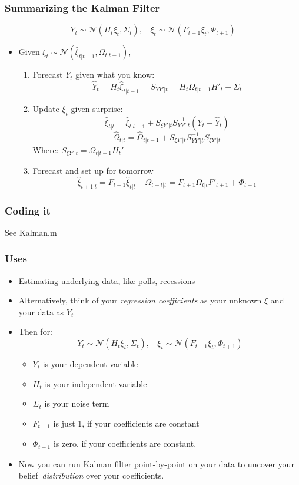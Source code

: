 \documentclass{beamer}
\begin{document}
\begin{frame}
\frametitle[alignment=center]{Summarizing the Kalman Filter}
$$Y_t\sim\mathcal{N}\left(H_t\xi_t,\Sigma_t\right),\ \ \ \ \xi_{t}\sim\mathcal{N}\left(F_{t+1}\xi_t,\Phi_{t+1}\right)$$
\begin{itemize}
\item Given $\xi_t\sim\mathcal{N}(\hat{\xi}_{t|t-1},\Omega_{t|t-1})$,
\begin{enumerate}
\item Forecast $Y_t$ given what you know:
$$\hat{Y}_t=H_t\hat{\xi}_{t|t-1}\ \ \ \ \ \ S_{YY'|t}=H_t\Omega_{t|t-1}H'_t+\Sigma_t$$
\item Update $\xi_t$ given surprise:
$$\hat{\xi}_{t|t}=\hat{\xi}_{t|t-1}+S_{\xi Y'|t}S_{YY'|t}^{-1}(Y_t-\hat{Y}_t)$$
$$\hat{\Omega}_{t|t}=\hat{\Omega}_{t|t-1}+S_{\xi Y'|t}S_{YY'|t}^{-1}S_{\xi Y'|t}$$
Where: $S_{\xi Y'|t}=\Omega_{t|t-1}H_t'$
\item Forecast and set up for tomorrow
$$\hat{\xi}_{t+1|t}=F_{t+1}\hat{\xi}_{t|t}\ \ \ \ \ \Omega_{t+t|t}=F_{t+1}\Omega_{t|t}F'_{t+1}+\Phi_{t+1}$$
\end{enumerate}
\end{itemize}
\end{frame}

\begin{frame}
\frametitle[alignment=center]{Coding it}
See Kalman.m
\end{frame}

\begin{frame}
\frametitle[alignment=center]{Uses}
\begin{itemize}
\item Estimating underlying data, like polls, recessions
\bigskip
\item Alternatively, think of your \emph{regression coefficients} as your unknown $\xi$ and your data as $Y_t$
\bigskip
\item Then for:
$$Y_t\sim\mathcal{N}\left(H_t\xi_t,\Sigma_t\right),\ \ \ \ \xi_{t}\sim\mathcal{N}\left(F_{t+1}\xi_t,\Phi_{t+1}\right)$$
\begin{itemize}
\item $Y_t$ is your dependent variable
\item $H_t$ is your independent variable
\item $\Sigma_t$ is your noise term
\item $F_{t+1}$ is just 1, if your coefficients are constant
\item $\Phi_{t+1}$ is zero, if your coefficients are constant.
\end{itemize}
\item Now you can run Kalman filter point-by-point on your data to uncover your belief\ \emph{distribution} over your coefficients.
\end{itemize}
\end{frame}
\end{document}
